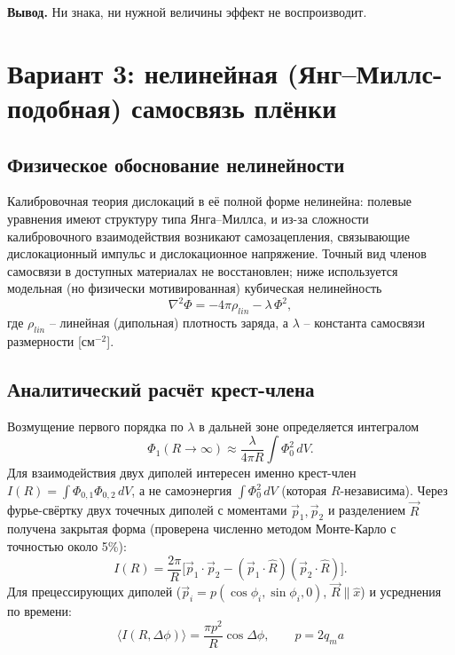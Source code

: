 \documentclass[12pt,a4paper]{article}
\begin{document}
\textbf{Вывод.} Ни знака, ни нужной величины эффект не воспроизводит.

\section{Вариант 3: нелинейная (Янг--Миллс-подобная) самосвязь плёнки}

\subsection{Физическое обоснование нелинейности}

Калибровочная теория дислокаций в её полной форме нелинейна: полевые
уравнения имеют структуру типа Янга--Миллса, и из-за сложности
калибровочного взаимодействия возникают самозацепления, связывающие
дислокационный импульс и дислокационное напряжение. Точный вид членов
самосвязи в доступных материалах не восстановлен; ниже используется
модельная (но физически мотивированная) кубическая нелинейность
\begin{equation}
\nabla^2\Phi = -4\pi\rho_{lin} - \lambda\,\Phi^2,
\end{equation}
где $\rho_{lin}$ -- линейная (дипольная) плотность заряда, а $\lambda$ --
константа самосвязи размерности [см$^{-2}$].

\subsection{Аналитический расчёт крест-члена}

Возмущение первого порядка по $\lambda$ в дальней зоне определяется
интегралом
\begin{equation}
\Phi_1(R\to\infty) \approx \frac{\lambda}{4\pi R}\int \Phi_0^2\,dV.
\end{equation}
Для взаимодействия двух диполей интересен именно крест-член
$I(R)=\int \Phi_{0,1}\Phi_{0,2}\,dV$, а не самоэнергия $\int\Phi_0^2\,dV$
(которая $R$-независима). Через фурье-свёртку двух точечных диполей
с моментами $\vec p_1,\vec p_2$ и разделением $\vec R$ получена
закрытая форма (проверена численно методом Монте-Карло с точностью
около 5\%):
\begin{equation}
I(R) = \frac{2\pi}{R}\Big[\vec p_1\cdot\vec p_2
- (\vec p_1\cdot\hat R)(\vec p_2\cdot\hat R)\Big].
\end{equation}
Для прецессирующих диполей ($\vec p_i = p(\cos\phi_i,\sin\phi_i,0)$,
$\vec R\parallel \hat x$) и усреднения по времени:
\begin{equation}
\boxed{\ \langle I(R,\Delta\phi)\rangle
= \frac{\pi p^2}{R}\cos\Delta\phi,\qquad p=2q_m a\ }
\end{equation}
\end{document}
